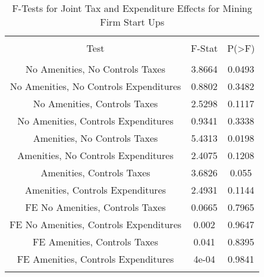 
\begin{table}[!htbp] \centering 
  \caption{F-Tests for Joint Tax and Expenditure Effects for Mining Firm Start Ups} 
  \label{21Ftests} 
\begin{tabular}{@{\extracolsep{5pt}} ccc} 
\\[-1.8ex]\hline 
\hline \\[-1.8ex] 
Test & F-Stat & P(\textgreater F) \\ 
\hline \\[-1.8ex] 
No Amenities, No Controls Taxes & 3.8664 & 0.0493 \\ 
No Amenities, No Controls Expenditures & 0.8802 & 0.3482 \\ 
No Amenities, Controls Taxes & 2.5298 & 0.1117 \\ 
No Amenities, Controls Expenditures & 0.9341 & 0.3338 \\ 
Amenities, No Controls Taxes & 5.4313 & 0.0198 \\ 
Amenities, No Controls Expenditures & 2.4075 & 0.1208 \\ 
Amenities, Controls Taxes & 3.6826 & 0.055 \\ 
Amenities, Controls Expenditures & 2.4931 & 0.1144 \\ 
FE No Amenities, Controls Taxes & 0.0665 & 0.7965 \\ 
FE No Amenities, Controls Expenditures & 0.002 & 0.9647 \\ 
FE Amenities, Controls Taxes & 0.041 & 0.8395 \\ 
FE Amenities, Controls Expenditures & 4e-04 & 0.9841 \\ 
\hline \\[-1.8ex] 
\end{tabular} 
\end{table} 
